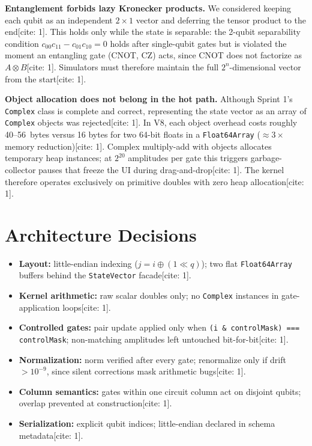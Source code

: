 \documentclass[conference]{IEEEtran}
\begin{document}
\textbf{Entanglement forbids lazy Kronecker products.} We considered keeping each qubit as an independent $2\times1$ vector and deferring the tensor product to the end[cite: 1]. This holds only while the state is separable: the 2-qubit separability condition $c_{00}c_{11} - c_{01}c_{10} = 0$ holds after single-qubit gates but is violated the moment an entangling gate (CNOT, CZ) acts, since CNOT does not factorize as $A \otimes B$[cite: 1]. Simulators must therefore maintain the full $2^n$-dimensional vector from the start[cite: 1].

\textbf{Object allocation does not belong in the hot path.} Although Sprint 1's \texttt{Complex} class is complete and correct, representing the state vector as an array of \texttt{Complex} objects was rejected[cite: 1]. In V8, each object overhead costs roughly 40--56~bytes versus 16 bytes for two 64-bit floats in a \texttt{Float64Array} ($\approx 3\times$ memory reduction)[cite: 1]. Complex multiply-add with objects allocates temporary heap instances; at $2^{20}$ amplitudes per gate this triggers garbage-collector pauses that freeze the UI during drag-and-drop[cite: 1]. The kernel therefore operates exclusively on primitive doubles with zero heap allocation[cite: 1].

\section{Architecture Decisions}
\begin{itemize}
    \item \textbf{Layout:} little-endian indexing ($j = i \oplus (1 \ll q)$); two flat \texttt{Float64Array} buffers behind the \texttt{StateVector} facade[cite: 1].
    \item \textbf{Kernel arithmetic:} raw scalar doubles only; no \texttt{Complex} instances in gate-application loops[cite: 1].
    \item \textbf{Controlled gates:} pair update applied only when \texttt{(i \& controlMask) === controlMask}; non-matching amplitudes left untouched bit-for-bit[cite: 1].
    \item \textbf{Normalization:} norm verified after every gate; renormalize only if drift $> 10^{-9}$, since silent corrections mask arithmetic bugs[cite: 1].
    \item \textbf{Column semantics:} gates within one circuit column act on disjoint qubits; overlap prevented at construction[cite: 1].
    \item \textbf{Serialization:} explicit qubit indices; little-endian declared in schema metadata[cite: 1].
\end{itemize}
\end{document}
